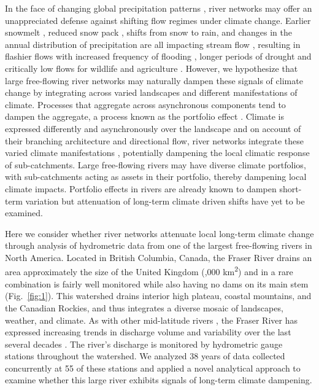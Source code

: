 \documentclass[9pt,twocolumn,twoside,lineno]{pnas-new}
\begin{document}
In the face of changing global precipitation patterns \citep{Donat:2016}, river networks may offer an unappreciated defense against shifting flow regimes under climate change\citep{Hartmann:2013,Palmer:2009}. Earlier snowmelt \citep{Rauscher:2008}, reduced snow pack \citep{McCabe:2014}, shifts from snow to rain, and changes in the annual distribution of precipitation are all impacting stream flow \citep{Hartmann:2013}, resulting in flashier flows with increased frequency of flooding \citep{Hirabayashi:2013}, longer periods of drought and critically low flows for wildlife and agriculture \citep{Melillo:2014}. However, we hypothesize that large free-flowing river networks may naturally dampen these signals of climate change by integrating across varied landscapes and different manifestations of climate. Processes that aggregate across asynchronous components tend to dampen the aggregate, a process known as the portfolio effect \citep{Doak:1998}. Climate is expressed differently and asynchronously over the landscape \citep{George:2015} and on account of their branching architecture and directional flow, river networks integrate these varied climate manifestations \citep{Peterson:2013}, potentially dampening the local climatic response of sub-catchments. Large free-flowing rivers may have diverse climate portfolios, with sub-catchments acting as assets in their portfolio, thereby dampening local climate impacts. Portfolio effects in rivers are already known to dampen short-term variation \citep{Moore:2015,Yeakel:2014} but attenuation of long-term climate driven shifts have yet to be examined.

Here we consider whether river networks attenuate local long-term climate change through analysis of hydrometric data from one of the largest free-flowing rivers in North America. Located in British Columbia, Canada, the Fraser River drains an area approximately the size of the United Kingdom (,000 km\textsuperscript{2}) and in a rare combination is fairly well monitored while also having no dams on its main stem \citep{Vorosmarty:2010} (Fig.~\ref{fig:1}). This watershed drains interior high plateau, coastal mountains, and the Canadian Rockies, and thus integrates a diverse mosaic of landscapes, weather, and climate. As with other mid-latitude rivers \citep{Bindoff:2013}, the Fraser River has expressed increasing trends in discharge volume and variability over the last several decades \citep{Dery:2012,Morrison:2002}. The river's discharge is monitored by hydrometric gauge stations throughout the watershed. We analyzed 38 years of data collected concurrently at 55 of these stations and applied a novel analytical approach to examine whether this large river exhibits signals of long-term climate dampening.
\end{document}
